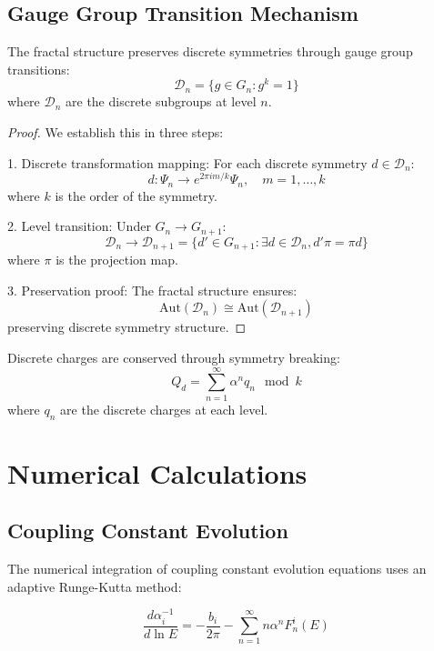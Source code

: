 \documentclass{article}
\begin{document}
\subsection{Gauge Group Transition Mechanism}

\begin{theorem}
The fractal structure preserves discrete symmetries through gauge group transitions:
\[
\mathcal{D}_n = \{g \in G_n : g^k = 1\}
\]
where $\mathcal{D}_n$ are the discrete subgroups at level $n$.
\end{theorem}

\begin{proof}
We establish this in three steps:

1. Discrete transformation mapping:
   For each discrete symmetry $d \in \mathcal{D}_n$:
   \[
   d: \Psi_n \to e^{2\pi i m/k}\Psi_n, \quad m = 1,\ldots,k
   \]
   where $k$ is the order of the symmetry.

2. Level transition:
   Under $G_n \to G_{n+1}$:
   \[
   \mathcal{D}_n \to \mathcal{D}_{n+1} = \{d' \in G_{n+1} : \exists d \in \mathcal{D}_n, d'\pi = \pi d\}
   \]
   where $\pi$ is the projection map.

3. Preservation proof:
   The fractal structure ensures:
   \[
   \text{Aut}(\mathcal{D}_n) \cong \text{Aut}(\mathcal{D}_{n+1})
   \]
   preserving discrete symmetry structure.
\end{proof}

\begin{corollary}
Discrete charges are conserved through symmetry breaking:
\[
Q_d = \sum_{n=1}^{\infty} \alpha^n q_n \mod k
\]
where $q_n$ are the discrete charges at each level.
\end{corollary}

\section{Numerical Calculations}
\label{app:numerical}

\subsection{Coupling Constant Evolution}

The numerical integration of coupling constant evolution equations uses an adaptive Runge-Kutta method:

\begin{equation}
\frac{d\alpha_i^{-1}}{d\ln E} = -\frac{b_i}{2\pi} - \sum_{n=1}^{\infty} n\alpha^n F_n^i(E)
\end{equation}
\end{document}
